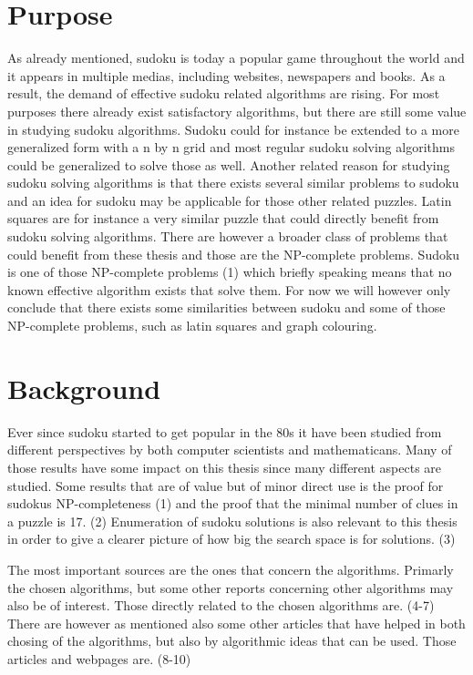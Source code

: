 \documentclass[a4paper,11pt]{kth-mag}
\begin{document}
\section{Purpose}
As already mentioned, sudoku is today a popular game throughout the world and it appears 
in multiple medias, including websites, newspapers and books. 
As a result, the demand of effective sudoku related algorithms are rising. 
For most purposes there already exist satisfactory algorithms, but there are 
still some value in studying sudoku algorithms. 
Sudoku could for instance be extended to a more generalized form with 
a n by n grid and most regular sudoku solving algorithms could be generalized 
to solve those as well. 
Another related reason for studying sudoku solving algorithms is that there exists 
several similar problems to sudoku and an idea for sudoku may be applicable for 
those other related puzzles. 
Latin squares are for instance a very similar puzzle that could directly benefit 
from sudoku solving algorithms. 
There are however a broader class of problems that could benefit from these thesis 
and those are the NP-complete problems. 
Sudoku is one of those NP-complete problems (1) which briefly speaking means that 
no known effective algorithm exists that solve them. 
For now we will however only conclude that there exists some similarities between 
sudoku and some of those NP-complete problems, such as latin squares and graph colouring. 

\section{Background}
Ever since sudoku started to get popular in the 80s it have been studied from different perspectives by both computer scientists and mathematicans. Many of those results have some impact on this thesis since many different aspects are studied. Some results that are of value but of minor direct use is the proof for sudokus NP-completeness (1) and the proof that the minimal number of clues in a puzzle is 17. (2) Enumeration of sudoku solutions is also relevant to this thesis in order to give a clearer picture of how big the search space is for solutions. (3)

The most important sources are the ones that concern the algorithms. Primarly the chosen algorithms, but some other reports concerning other algorithms may also be of interest. Those directly related to the chosen algorithms are. (4-7) There are however as mentioned also some other articles that have helped in both chosing of the algorithms, but also by algorithmic ideas that can be used. Those articles and webpages are. (8-10)
\end{document}
